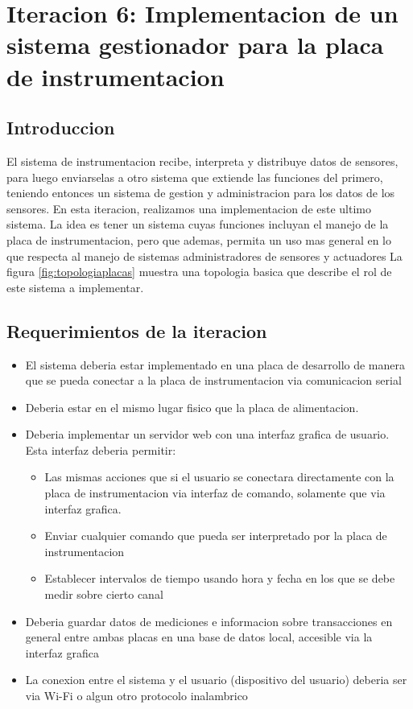 \chapter{Iteracion 6: Implementacion de un sistema gestionador para la placa de instrumentacion} %
\label{cha:iteracion_6}

\section{Introduccion} %
\label{sec:introduccion}

El sistema de instrumentacion recibe, interpreta y distribuye datos de sensores, para luego enviarselas a otro sistema que extiende las funciones del primero, teniendo entonces un sistema de gestion y administracion para los datos de los sensores. En esta iteracion, realizamos una implementacion de este ultimo sistema. La idea es tener un sistema cuyas funciones incluyan el manejo de la placa de instrumentacion, pero que ademas, permita un uso mas general en lo que respecta al manejo de sistemas administradores de sensores y actuadores
La figura \ref{fig:topologiaplacas} muestra una topologia basica que describe el rol de este sistema a implementar.


\section{Requerimientos de la iteracion} %
\label{sec:requerimientos_de_la_iteracion}

\begin{itemize}
\item El sistema deberia estar implementado en una placa de desarrollo de manera que se pueda conectar a la placa de instrumentacion via comunicacion serial
\item Deberia estar en el mismo lugar fisico que la placa de alimentacion.
\item Deberia implementar un servidor web con una interfaz grafica de usuario. Esta interfaz deberia permitir:
\begin{itemize}
	\item Las mismas acciones que si el usuario se conectara directamente con la placa de instrumentacion via interfaz de comando, solamente que via interfaz grafica.
	\item Enviar cualquier comando que pueda ser interpretado por la placa de instrumentacion
	\item Establecer intervalos de tiempo usando hora y fecha en los que se debe medir sobre cierto canal
\end{itemize}
\item Deberia guardar datos de mediciones e informacion sobre transacciones en general entre ambas placas en una base de datos local, accesible via la interfaz grafica 
\item La conexion entre el sistema y el usuario (dispositivo del usuario) deberia ser via Wi-Fi o algun otro protocolo inalambrico
\end{itemize}


